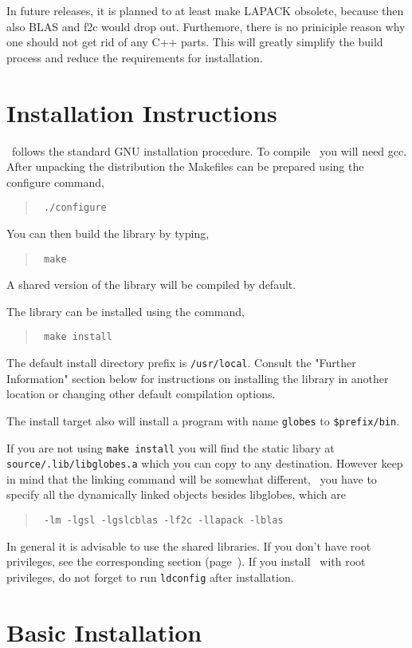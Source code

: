 \begin{appendix}
In future releases, it is planned to at least make LAPACK obsolete, because
then also BLAS and f2c would drop out. Furthemore, there is no priniciple
reason why one should not get rid of any C++ parts. 
This will greatly simplify
the build process and reduce the requirements for installation.

\section*{Installation Instructions}

\GLOBES\ follows the standard GNU installation procedure.  To compile \GLOBES\
you will need gcc.  After unpacking the distribution
the Makefiles can be prepared using the configure command,
\begin{quote}
{\tt
./configure
}
\end{quote}
You can then build the library by typing,
\begin{quote}
{\tt
make
}
\end{quote}
A shared  version of the library will be compiled by
default. 
 
The library can be installed using the command,
\begin{quote}
{\tt
make install
}
\end{quote}
The default install directory prefix is \verb+/usr/local+.  Consult the
"Further Information" section below for instructions on installing the
library in another location or changing other default compilation
options.

The install target also will install a program with name \verb+globes+ to
\verb+$prefix/bin+.

If you are not using \verb+make install+ you will find the static libary
at \verb+source/.lib/libglobes.a+ which you can copy to any destination.
However keep in mind that the linking command will be somewhat different,
\ie\ you have to specify all the dynamically linked objects besides libglobes,
which are
\begin{quote}
{\tt
         -lm -lgsl -lgslcblas -lf2c -llapack -lblas
}
\end{quote}

In general it is advisable to use the shared libraries. If you don't
have root privileges, see the corresponding section 
(page~\pageref{inst_noroot}).
If you install \GLOBES\ with root privileges, do not forget to run 
{\tt ldconfig} after installation.
 
\section*{Basic Installation}


\end{appendix}
